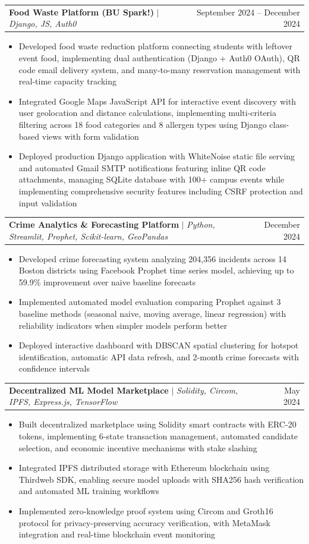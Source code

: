 \documentclass[letterpaper,11pt]{article}
\makeatletter
\newcommand{\resumeItem}[1]{
  \item\small{
    {#1 \vspace{-2pt}}
  }
}
\newcommand{\resumeProjectHeading}[2]{
    \item
    \begin{tabular*}{0.97\textwidth}{l@{\extracolsep{\fill}}r}
      \small#1 & #2 \\
    \end{tabular*}\vspace{-7pt}
}
\newcommand{\resumeItemListStart}{\begin{itemize}}
\newcommand{\resumeItemListEnd}{\end{itemize}\vspace{-5pt}}
\makeatother
\begin{document}
    \resumeProjectHeading
      {\textbf{Food Waste Platform (BU Spark!)} $|$ \emph{Django, JS, Auth0}}{September 2024 -- December 2024}
      \resumeItemListStart
        \resumeItem{Developed food waste reduction platform connecting students with leftover event food, implementing dual authentication (Django + Auth0 OAuth), QR code email delivery system, and many-to-many reservation management with real-time capacity tracking}
        \resumeItem{Integrated Google Maps JavaScript API for interactive event discovery with user geolocation and distance calculations, implementing multi-criteria filtering across 18 food categories and 8 allergen types using Django class-based views with form validation}
        \resumeItem{Deployed production Django application with WhiteNoise static file serving and automated Gmail SMTP notifications featuring inline QR code attachments, managing SQLite database with 100+ campus events while implementing comprehensive security features including CSRF protection and input validation}
      \resumeItemListEnd

    \resumeProjectHeading
      {\textbf{Crime Analytics \& Forecasting Platform} $|$ \emph{Python, Streamlit, Prophet, Scikit-learn, GeoPandas}}{December 2024}
      \resumeItemListStart
        \resumeItem{Developed crime forecasting system analyzing 204,356 incidents across 14 Boston districts using Facebook Prophet time series model, achieving up to 59.9\% improvement over naive baseline forecasts}
        \resumeItem{Implemented automated model evaluation comparing Prophet against 3 baseline methods (seasonal naive, moving average, linear regression) with reliability indicators when simpler models perform better}
        \resumeItem{Deployed interactive dashboard with DBSCAN spatial clustering for hotspot identification, automatic API data refresh, and 2-month crime forecasts with confidence intervals}
      \resumeItemListEnd

    \resumeProjectHeading
      {\textbf{Decentralized ML Model Marketplace} $|$ \emph{Solidity, Circom, IPFS, Express.js, TensorFlow}}{May 2024}
      \resumeItemListStart
        \resumeItem{Built decentralized marketplace using Solidity smart contracts with ERC-20 tokens, implementing 6-state transaction management, automated candidate selection, and economic incentive mechanisms with stake slashing}
        \resumeItem{Integrated IPFS distributed storage with Ethereum blockchain using Thirdweb SDK, enabling secure model uploads with SHA256 hash verification and automated ML training workflows}
        \resumeItem{Implemented zero-knowledge proof system using Circom and Groth16 protocol for privacy-preserving accuracy verification, with MetaMask integration and real-time blockchain event monitoring}
      \resumeItemListEnd
\end{document}
